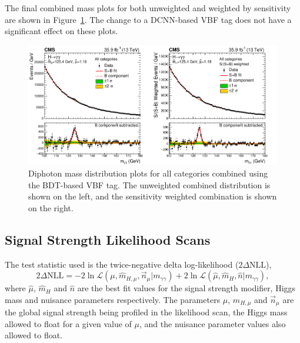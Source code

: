 The final combined mass plots for both unweighted and weighted by sensitivity are shown in Figure~\ref{fig:stats_results:comb_mass_plots}. The change to a DCNN-based VBF tag does not have a significant effect on these plots.
\begin{figure}[h!]
    \begin{center}
        \includegraphics[width=1.0\textwidth]{figures/stats_results/CMS-HIG-16-040_Figure_014.pdf}
    \end{center}
    \caption{Diphoton mass distribution plots for all categories combined using the BDT-based VBF tag.
            The unweighted combined distribution is shown on the left, and the sensitivity weighted combination is shown on the right.}
        \label{fig:stats_results:comb_mass_plots}
\end{figure}








\subsection{Signal Strength Likelihood Scans}
The test statistic used is the twice-negative delta log-likelihood ($2\Delta{\mathrm{NLL}}$), 
\begin{equation}
    2\Delta{\mathrm{NLL}} = -2\ln{\mathcal{L}}(\mu,\hat{m}_{H,\mu},\vec{n}_{\mu} | m_{\gamma\gamma}) + 2\ln\mathcal{L}(\hat{\mu},\hat{m}_{H},\hat{n} | m_{\gamma\gamma}),
\end{equation}
where $\hat{\mu}$, $\hat{m}_{H}$ and $\hat{n}$ are the best fit values for the signal strength modifier, Higgs mass and nuisance parameters respectively. 
The parameters $\mu$, $\hat{m}_{H,\mu}$ and $\vec{n}_{\mu}$ are the global signal strength being profiled in the likelihood scan, the Higgs mass allowed to float for a given value of $\mu$, and the nuisance parameter values also allowed to float. 

